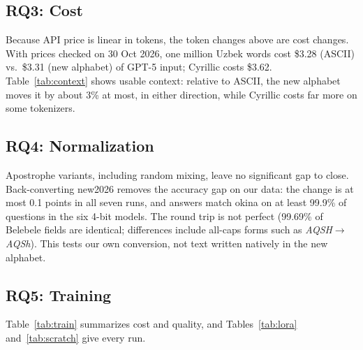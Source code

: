 \subsection{RQ3: Cost}
Because API price is linear in tokens, the token changes above are cost changes. With prices checked on 30 Oct 2026, one million Uzbek words cost \$3.28 (ASCII) vs.\ \$3.31 (new alphabet) of GPT-5 input; Cyrillic costs \$3.62. Table~\ref{tab:context} shows usable context: relative to ASCII, the new alphabet moves it by about 3\% at most, in either direction, while Cyrillic costs far more on some tokenizers.

\subsection{RQ4: Normalization}
Apostrophe variants, including random mixing, leave no significant gap to close. Back-converting new2026 removes the accuracy gap on our data: the change is at most 0.1 points in all seven runs, and answers match okina on at least 99.9\% of questions in the six 4-bit models. The round trip is not perfect (99.69\% of Belebele fields are identical; differences include all-caps forms such as \emph{AQSH}$\to$\emph{AQSh}). This tests our own conversion, not text written natively in the new alphabet.

\subsection{RQ5: Training}
Table~\ref{tab:train} summarizes cost and quality, and Tables~\ref{tab:lora} and~\ref{tab:scratch} give every run.

\begin{table}[t]
\centering\small
\setlength{\tabcolsep}{3pt}
\caption{Training on old vs.\ new spelling: mean $\pm$ SD over three seeds. Bits per word on validation text in the same spelling.}
\label{tab:train}
\end{table}

